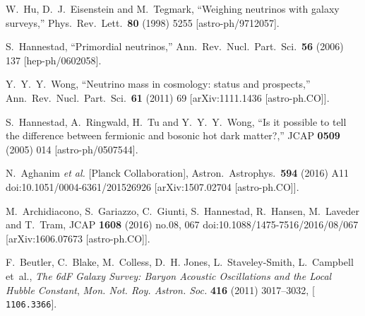 \documentclass[11pt,a4paper]{article}
\renewcommand\({\left(}
\renewcommand\){\right)}
\renewcommand\[{\left[}
\renewcommand\]{\right]}
\begin{document}
\begin{thebibliography}{10}
  W.~Hu, D.~J.~Eisenstein and M.~Tegmark,
  ``Weighing neutrinos with galaxy surveys,''
  Phys.\ Rev.\ Lett.\  {\bf 80} (1998) 5255
  [astro-ph/9712057].
	
  S.~Hannestad,
  ``Primordial neutrinos,''
  Ann.\ Rev.\ Nucl.\ Part.\ Sci.\  {\bf 56} (2006) 137
  [hep-ph/0602058].
	
  Y.~Y.~Y.~Wong,
  ``Neutrino mass in cosmology: status and prospects,''
  Ann.\ Rev.\ Nucl.\ Part.\ Sci.\  {\bf 61} (2011) 69
  [arXiv:1111.1436 [astro-ph.CO]].
  
  S.~Hannestad, A.~Ringwald, H.~Tu and Y.~Y.~Y.~Wong,
  ``Is it possible to tell the difference between fermionic and bosonic hot dark matter?,''
  JCAP {\bf 0509} (2005) 014
  [astro-ph/0507544].
    
  N.~Aghanim {\it et al.} [Planck Collaboration],
  Astron.\ Astrophys.\  {\bf 594} (2016) A11
  doi:10.1051/0004-6361/201526926
  [arXiv:1507.02704 [astro-ph.CO]].
	
  M.~Archidiacono, S.~Gariazzo, C.~Giunti, S.~Hannestad, R.~Hansen, M.~Laveder and T.~Tram,
  JCAP {\bf 1608} (2016) no.08,  067
  doi:10.1088/1475-7516/2016/08/067
  [arXiv:1606.07673 [astro-ph.CO]].
	
F.~Beutler, C.~Blake, M.~Colless, D.~H. Jones, L.~Staveley-Smith, L.~Campbell
  et~al., \emph{{The 6{dF} Galaxy Survey: Baryon Acoustic Oscillations and the
  Local Hubble Constant}},
  {\emph{Mon. Not. Roy. Astron. Soc.} {\bf 416} (2011) 3017--3032},
  [%
   {{\tt 1106.3366}}].


\end{thebibliography}
\end{document}

